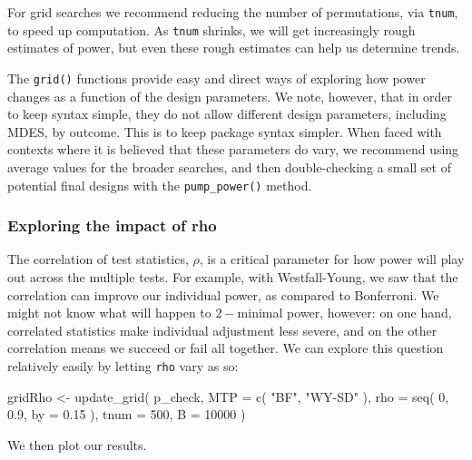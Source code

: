 \documentclass{article}
\newenvironment{Shaded}{\begin{snugshade}}{\end{snugshade}}
\newcommand{\AttributeTok}[1]{\textcolor[rgb]{0.77,0.63,0.00}{#1}}
\newcommand{\DecValTok}[1]{\textcolor[rgb]{0.00,0.00,0.81}{#1}}
\newcommand{\FloatTok}[1]{\textcolor[rgb]{0.00,0.00,0.81}{#1}}
\newcommand{\FunctionTok}[1]{\textcolor[rgb]{0.00,0.00,0.00}{#1}}
\newcommand{\NormalTok}[1]{#1}
\newcommand{\OtherTok}[1]{\textcolor[rgb]{0.56,0.35,0.01}{#1}}
\newcommand{\StringTok}[1]{\textcolor[rgb]{0.31,0.60,0.02}{#1}}
\begin{document}
For grid searches we recommend reducing the number of permutations, via
\texttt{tnum}, to speed up computation. As \texttt{tnum} shrinks, we
will get increasingly rough estimates of power, but even these rough
estimates can help us determine trends.

The \texttt{grid()} functions provide easy and direct ways of exploring
how power changes as a function of the design parameters. We note,
however, that in order to keep syntax simple, they do not allow
different design parameters, including MDES, by outcome. This is to keep
package syntax simpler. When faced with contexts where it is believed
that these parameters do vary, we recommend using average values for the
broader searches, and then double-checking a small set of potential
final designs with the \texttt{pump\_power()} method.

\subsubsection{Exploring the impact of rho}

The correlation of test statistics, \(\rho\), is a critical parameter
for how power will play out across the multiple tests. For example, with
Westfall-Young, we saw that the correlation can improve our individual
power, as compared to Bonferroni. We might not know what will happen to
\(2-\)minimal power, however: on one hand, correlated statistics make
individual adjustment less severe, and on the other correlation means we
succeed or fail all together. We can explore this question relatively
easily by letting \texttt{rho} vary as so:

\begin{Shaded}
\begin{Highlighting}[]
\NormalTok{gridRho }\OtherTok{\textless{}{-}} \FunctionTok{update\_grid}\NormalTok{( p\_check,}
              \AttributeTok{MTP =} \FunctionTok{c}\NormalTok{( }\StringTok{"BF"}\NormalTok{, }\StringTok{"WY{-}SD"}\NormalTok{ ),}
              \AttributeTok{rho =} \FunctionTok{seq}\NormalTok{( }\DecValTok{0}\NormalTok{, }\FloatTok{0.9}\NormalTok{, }\AttributeTok{by =} \FloatTok{0.15}\NormalTok{ ),}
              \AttributeTok{tnum =} \DecValTok{500}\NormalTok{,}
              \AttributeTok{B =} \DecValTok{10000}\NormalTok{ )}
\end{Highlighting}
\end{Shaded}

We then plot our results.
\end{document}
